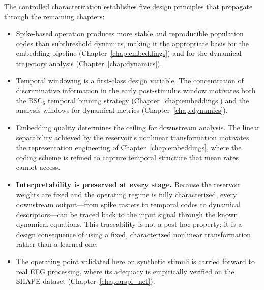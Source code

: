 The controlled characterization establishes five design principles that propagate through the remaining chapters:
\begin{itemize}
    \item Spike-based operation produces more stable and reproducible population codes than subthreshold dynamics, making it the appropriate basis for the embedding pipeline (Chapter~\ref{chap:embeddings}) and for the dynamical trajectory analysis (Chapter~\ref{chap:dynamics}).
    \item Temporal windowing is a first-class design variable. The concentration of discriminative information in the early post-stimulus window motivates both the BSC$_6$ temporal binning strategy (Chapter~\ref{chap:embeddings}) and the analysis windows for dynamical metrics (Chapter~\ref{chap:dynamics}).
    \item Embedding quality determines the ceiling for downstream analysis. The linear separability achieved by the reservoir's nonlinear transformation motivates the representation engineering of Chapter~\ref{chap:embeddings}, where the coding scheme is refined to capture temporal structure that mean rates cannot access.
    \item \textbf{Interpretability is preserved at every stage.} Because the reservoir weights are fixed and the operating regime is fully characterized, every downstream output---from spike rasters to temporal codes to dynamical descriptors---can be traced back to the input signal through the known dynamical equations. This traceability is not a post-hoc property; it is a design consequence of using a fixed, characterized nonlinear transformation rather than a learned one.
    \item The operating point validated here on synthetic stimuli is carried forward to real EEG processing, where its adequacy is empirically verified on the SHAPE dataset (Chapter~\ref{chap:arspi_net}).
\end{itemize}

